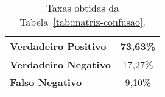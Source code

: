 	\begin{table}[htb]
		\begin{center}
			\caption{Taxas obtidas da Tabela~\ref{tab:matriz-confusao}.}
			\label{tab:taxas}
			\begin{tabular}{|l|c|}
				\hline \bf Verdadeiro Positivo & 73,63\% \\
				\hline \bf Verdadeiro Negativo & 17,27\% \\
				\hline \bf Falso Negativo & 9,10\% \\
				\hline
			\end{tabular}
		\end{center}
	\end{table}

